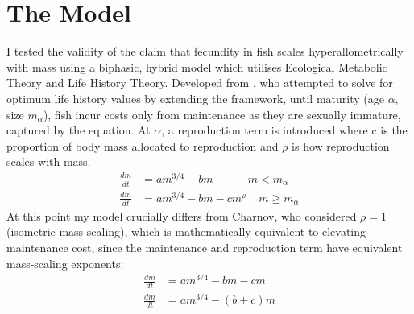 \documentclass[a4paper]{article} %
\begin{document}
\section{The Model}\thispagestyle{empty}
I tested the validity of the claim that fecundity in fish scales hyperallometrically with mass using a biphasic, hybrid model which utilises Ecological Metabolic Theory and Life History Theory. Developed from \cite{Charnov2001}, who attempted to solve for optimum life history values by extending the \cite{West2001} framework, until maturity (age $\alpha$, size $m_{\alpha}$), fish incur costs only from maintenance as they are sexually immature, captured by the \cite{West2001} equation. At $\alpha$, a reproduction term is introduced where c is the proportion of body mass allocated to reproduction and $\rho$ is how reproduction scales with mass.
\begin{align}
    \frac{dm}{dt} &= am^{3/4} - bm \ \ \ \ \ \ \ \ \ \ \ \ \ \ m < m_{\alpha} \nonumber \\
    \frac{dm}{dt} &= am^{3/4} - bm - cm^{\rho} \ \ \ \ \ m \geq m_{\alpha} \label{luke_model}
\end{align}
At this point my model crucially differs from Charnov, who considered $\rho = 1$ (isometric mass-scaling), which is mathematically equivalent to elevating maintenance cost, since the maintenance and reproduction term have equivalent mass-scaling exponents:
\begin{align*}
    \frac{dm}{dt} &= am^{3/4} - bm - cm \\
    \frac{dm}{dt} &= am^{3/4} - (b+c)m
\end{align*}
\end{document}
